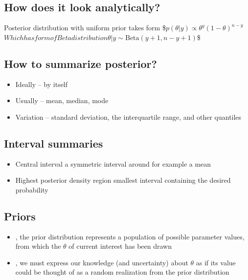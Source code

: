 \documentclass[letterpaper,10pt,english]{jupyterBook}
\begin{document}
\subsection{How does it look analytically?}
\label{\detokenize{Lecture 2:how-does-it-look-analytically}}
\sphinxAtStartPar
Posterior distribution with uniform prior takes form
\$\( p(\theta|y)\propto \theta^y (1-\theta)^{n-y}\)\(
Which has form of Beta distribution
\)\( \theta|y\sim \mathrm{Beta} (y+1,n-y+1)\)\$


\subsection{How to summarize posterior?}
\label{\detokenize{Lecture 2:how-to-summarize-posterior}}\begin{itemize}
\item {} 
\sphinxAtStartPar
Ideally – by itself

\item {} 
\sphinxAtStartPar
Usually – mean, median, mode

\item {} 
\sphinxAtStartPar
Variation – standard deviation, the interquartile range, and other quantiles

\end{itemize}


\subsection{Interval summaries}
\label{\detokenize{Lecture 2:interval-summaries}}\begin{itemize}
\item {} 
\sphinxAtStartPar
Central interval \sphinxhyphen{} a symmetric interval around for example a mean

\item {} 
\sphinxAtStartPar
Highest posterior density region \sphinxhyphen{} smallest interval containing the desired probability

\end{itemize}




\subsection{Priors}
\label{\detokenize{Lecture 2:priors}}\begin{itemize}
\item {} 
\sphinxAtStartPar
{}, the prior distribution represents a population of possible parameter values, from which the \(\theta\) of current interest has been drawn

\item {} 
\sphinxAtStartPar
{}, we must express our knowledge (and uncertainty) about \(\theta\) as if its value could be thought of as a random realization from the prior distribution

\end{itemize}
\end{document}
